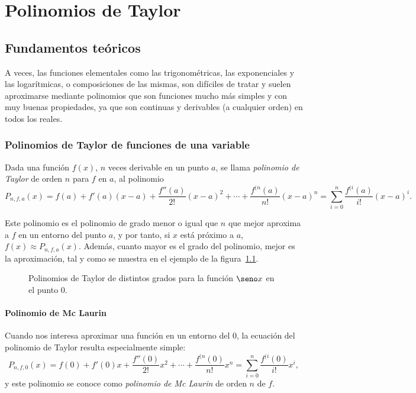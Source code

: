 \chapter{Polinomios de Taylor}

\section{Fundamentos teóricos}
A veces, las funciones elementales como las trigonométricas, las exponenciales y las logarítmicas, o composiciones de
las mismas, son difíciles de tratar y suelen aproximarse mediante polinomios que son funciones mucho más simples y con
muy buenas propiedades, ya que son continuas y derivables (a cualquier orden) en todos los reales.

\subsection{Polinomios de Taylor de funciones de una variable}
\begin{definicion}
Dada una función $f(x)$, $n$ veces derivable en un punto $a$, se llama \emph{polinomio de Taylor} de orden $n$ para $f$
en $a$, al polinomio
\[
P_{n,f,a}(x)=f(a)+f'(a)(x-a)+\frac{f''(a)}{2!}(x-a)^2+\cdots+\frac{f^{(n}(a)}{n!}(x-a)^n= \sum_{i=0}^{n}\frac{f^{(i}(a)}{i!}(x-a)^i.
\]
\end{definicion}

Este polinomio es el polinomio de grado menor o igual que $n$ que mejor aproxima a $f$ en un entorno del punto $a$, y
por tanto, si $x$ está próximo a $a$, $f(x)\approx P_{n,f,a}(x)$. 
Además, cuanto mayor es el grado del polinomio, mejor es la aproximación, tal y como se muestra en el ejemplo de la
figura~\ref{g:polinomios}.
\begin{figure}[h!]
\begin{center}
\scalebox{1}{}
\caption{Polinomios de Taylor de distintos grados para la función $\seno x$ en el punto 0.}
\label{g:polinomios}
\end{center}
\end{figure}

\subsubsection*{Polinomio de Mc Laurin}
Cuando nos interesa aproximar una función en un entorno del 0, la ecuación del polinomio de Taylor resulta especialmente simple:
\[
P_{n,f,0}(x)=f(0)+f'(0)x+\frac{f''(0)}{2!}x^2+\cdots+\frac{f^{(n}(0)}{n!}x^n= \sum_{i=0}^{n}\frac{f^{(i}(0)}{i!}x^i,
\]
y este polinomio se conoce como \emph{polinomio de Mc Laurin} de orden $n$ de $f$.

